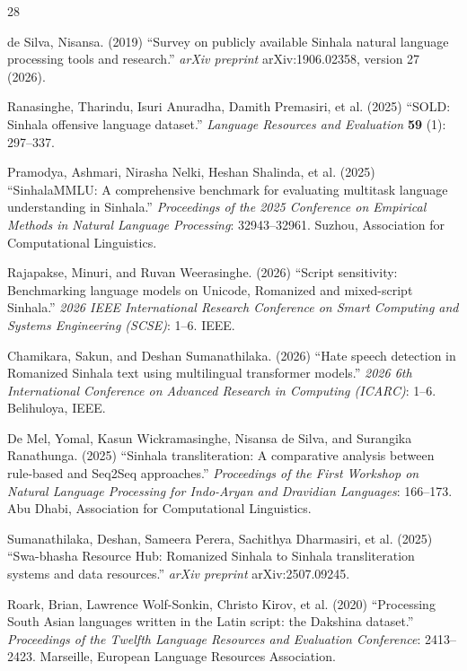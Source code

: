 \documentclass[3p,times,procedia]{elsarticle}
\begin{document}
\begin{thebibliography}{28}

de Silva, Nisansa. (2019) ``Survey on publicly available Sinhala natural language processing tools and research.'' {\it arXiv preprint} arXiv:1906.02358, version 27 (2026).

Ranasinghe, Tharindu, Isuri Anuradha, Damith Premasiri, et al. (2025) ``SOLD: Sinhala offensive language dataset.'' {\it Language Resources and Evaluation} {\bf 59} (1): 297--337.

Pramodya, Ashmari, Nirasha Nelki, Heshan Shalinda, et al. (2025) ``SinhalaMMLU: A comprehensive benchmark for evaluating multitask language understanding in Sinhala.'' {\it Proceedings of the 2025 Conference on Empirical Methods in Natural Language Processing}: 32943--32961. Suzhou, Association for Computational Linguistics.

Rajapakse, Minuri, and Ruvan Weerasinghe. (2026) ``Script sensitivity: Benchmarking language models on Unicode, Romanized and mixed-script Sinhala.'' {\it 2026 IEEE International Research Conference on Smart Computing and Systems Engineering (SCSE)}: 1--6. IEEE.

Chamikara, Sakun, and Deshan Sumanathilaka. (2026) ``Hate speech detection in Romanized Sinhala text using multilingual transformer models.'' {\it 2026 6th International Conference on Advanced Research in Computing (ICARC)}: 1--6. Belihuloya, IEEE.

De Mel, Yomal, Kasun Wickramasinghe, Nisansa de Silva, and Surangika Ranathunga. (2025) ``Sinhala transliteration: A comparative analysis between rule-based and Seq2Seq approaches.'' {\it Proceedings of the First Workshop on Natural Language Processing for Indo-Aryan and Dravidian Languages}: 166--173. Abu Dhabi, Association for Computational Linguistics.

Sumanathilaka, Deshan, Sameera Perera, Sachithya Dharmasiri, et al. (2025) ``Swa-bhasha Resource Hub: Romanized Sinhala to Sinhala transliteration systems and data resources.'' {\it arXiv preprint} arXiv:2507.09245.

Roark, Brian, Lawrence Wolf-Sonkin, Christo Kirov, et al. (2020) ``Processing South Asian languages written in the Latin script: the Dakshina dataset.'' {\it Proceedings of the Twelfth Language Resources and Evaluation Conference}: 2413--2423. Marseille, European Language Resources Association.


\end{thebibliography}
\end{document}
